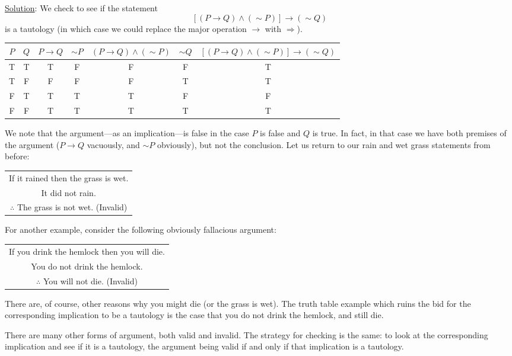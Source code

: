 \underline{Solution}: We check to see if the statement
$$[(P\rightarrow Q)\wedge(\sim P)]\longrightarrow(\sim Q)$$
is a tautology (in which case we could replace the
major operation $\longrightarrow$
with $\Longrightarrow$).
\begin{center}
{\rm
\begin{tabular}{|c|c|c|c|c|c|c|}
\hline
$P$&$Q$&$P\rightarrow Q$&$\sim P$&$(P\rightarrow Q)\wedge(\sim P)$
&$\sim Q$&$[(P\rightarrow Q)\wedge(\sim P)]\longrightarrow(\sim Q)$\\
\hline
T&T&T&F&F&F&T\\
T&F&F&F&F&T&T\\
F&T&T&T&T&F&F\\
F&F&T&T&T&T&T\\ \hline
\end{tabular}
}\end{center}
We note that the argument---as an implication---is false
in the case $P$ is false and $Q$ is true.  In fact, 
in that case we have both premises of the argument
($P\rightarrow Q$ vacuously, and $\sim P$ obviously),
but not the conclusion.  Let us return to our rain and 
wet grass statements from before:
\begin{center}
\begin{tabular}{c}
If it rained then the grass is wet.\\
It did not rain.\\ \hline
$\therefore$ The grass is not wet. (Invalid)
\end{tabular}
\end{center}
For another example, consider the following obviously fallacious
argument:
\begin{center}
\begin{tabular}{c}
If you drink the hemlock then you will die.\\
You do not drink the hemlock.\\ \hline
$\therefore$ You will not die. (Invalid)
\end{tabular}
\end{center}
There are, of course, other reasons why you might die (or the
grass is wet).  The truth table example which ruins the
bid for the corresponding implication to be a tautology
is the case that you do not drink the hemlock, and still die.
\eex

There are many other forms of argument, both valid and invalid.
The strategy for checking is the same:  to look at the corresponding
implication and see if it is a tautology, the argument being valid
if and only if that implication is a tautology.

